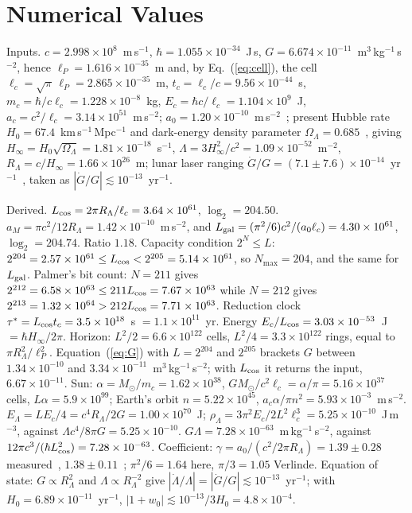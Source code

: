 \documentclass[aps,prd,twocolumn,superscriptaddress,nofootinbib,showkeys]{revtex4-2}
\newcommand{\lc}{\ell_c}
\newcommand{\tc}{t_c}
\newcommand{\mc}{m_c}
\newcommand{\Ec}{E_c}
\newcommand{\ac}{a_c}
\newcommand{\RL}{R_\Lambda}
\begin{document}
\appendix

\section{Numerical Values}
\label{app:numbers}

Inputs. $c = 2.998\times10^8$~m\,s$^{-1}$, $\hbar = 1.055\times10^{-34}$~J\,s, $G = 6.674\times10^{-11}$~m$^3$\,kg$^{-1}$\,s$^{-2}$, hence $\ell_P = 1.616\times10^{-35}$~m and, by Eq.~(\ref{eq:cell}), the cell $\lc = \sqrt\pi\,\ell_P = 2.865\times10^{-35}$~m, $\tc = \lc/c = 9.56\times10^{-44}$~s, $\mc = \hbar/c\lc = 1.228\times10^{-8}$~kg, $\Ec = \hbar c/\lc = 1.104\times10^9$~J, $\ac = c^2/\lc = 3.14\times10^{51}$~m\,s$^{-2}$; $a_0 = 1.20\times10^{-10}$~m\,s$^{-2}$~\cite{mcgaugh2016}; present Hubble rate $H_0 = 67.4$~km\,s$^{-1}$\,Mpc$^{-1}$ and dark-energy density parameter $\Omega_\Lambda = 0.685$~\cite{planck2018}, giving $H_\infty = H_0\sqrt{\Omega_\Lambda} = 1.81\times10^{-18}$~s$^{-1}$, $\Lambda = 3H_\infty^2/c^2 = 1.09\times10^{-52}$~m$^{-2}$, $\RL = c/H_\infty = 1.66\times10^{26}$~m; lunar laser ranging $\dot G/G = (7.1\pm7.6)\times10^{-14}$~yr$^{-1}$~\cite{hofmann2018}, taken as $|\dot G/G|\lesssim10^{-13}$~yr$^{-1}$.

Derived. $L_{\rm cos} = 2\pi\RL/\lc = 3.64\times10^{61}$, $\log_2 = 204.50$. $a_M = \pi c^2/12\RL = 1.42\times10^{-10}$~m\,s$^{-2}$, and $L_{\rm gal} = (\pi^2/6)c^2/(a_0\lc) = 4.30\times10^{61}$, $\log_2 = 204.74$. Ratio $1.18$. Capacity condition $2^N\le L$: $2^{204} = 2.57\times10^{61}\le L_{\rm cos} < 2^{205} = 5.14\times10^{61}$, so $N_{\max}=204$, and the same for $L_{\rm gal}$. Palmer's bit count: $N=211$ gives $2^{212} = 6.58\times10^{63}\le 211L_{\rm cos} = 7.67\times10^{63}$ while $N=212$ gives $2^{213} = 1.32\times10^{64} > 212L_{\rm cos} = 7.71\times10^{63}$. Reduction clock $\tau^* = L_{\rm cos}\tc = 3.5\times10^{18}$~s $= 1.1\times10^{11}$~yr. Energy $\Ec/L_{\rm cos} = 3.03\times10^{-53}$~J $= \hbar H_\infty/2\pi$. Horizon: $L^2/2 = 6.6\times10^{122}$ cells, $L^2/4 = 3.3\times10^{122}$ rings, equal to $\pi\RL^2/\ell_P^2$. Equation~(\ref{eq:G}) with $L = 2^{204}$ and $2^{205}$ brackets $G$ between $1.34\times10^{-10}$ and $3.34\times10^{-11}$~m$^3$\,kg$^{-1}$\,s$^{-2}$; with $L_{\rm cos}$ it returns the input, $6.67\times10^{-11}$. Sun: $\alpha = M_\odot/\mc = 1.62\times10^{38}$, $GM_\odot/c^2\lc = \alpha/\pi = 5.16\times10^{37}$ cells, $L\alpha = 5.9\times10^{99}$; Earth's orbit $n = 5.22\times10^{45}$, $\ac\alpha/\pi n^2 = 5.93\times10^{-3}$~m\,s$^{-2}$. $E_\Lambda = L\Ec/4 = c^4\RL/2G = 1.00\times10^{70}$~J; $\rho_\Lambda = 3\pi^2\Ec/2L^2\lc^3 = 5.25\times10^{-10}$~J\,m$^{-3}$, against $\Lambda c^4/8\pi G = 5.25\times10^{-10}$. $G\Lambda = 7.28\times10^{-63}$~m\,kg$^{-1}$\,s$^{-2}$, against $12\pi c^3/(\hbar L_{\rm cos}^2) = 7.28\times10^{-63}$. Coefficient: $\gamma = a_0/(c^2/2\pi\RL) = 1.39\pm0.28$ measured~\cite{mcgaugh2016}, $1.38\pm0.11$~\cite{desmond2023}; $\pi^2/6 = 1.64$ here, $\pi/3 = 1.05$ Verlinde. Equation of state: $G\propto\RL^2$ and $\Lambda\propto\RL^{-2}$ give $|\dot\Lambda/\Lambda| = |\dot G/G|\lesssim10^{-13}$~yr$^{-1}$; with $H_0 = 6.89\times10^{-11}$~yr$^{-1}$, $|1+w_0| \lesssim 10^{-13}/3H_0 = 4.8\times10^{-4}$.
\end{document}
